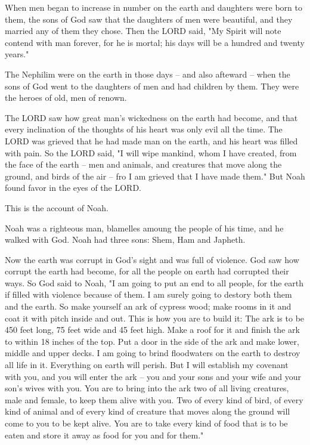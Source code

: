 \C When men began to increase in number on the earth and daughters were born to
them, \V the sons of God saw that the daughters of men were beautiful, and they
married any of them they chose. \V Then the LORD said, "My Spirit will note
contend with man forever, for he is mortal; his days will be a hundred and
twenty years."

\V The Nephilim were on the earth in those days -- and also afteward -- when the
sons of God went to the daughters of men and had children by them. They were the
heroes of old, men of renown.

\V The LORD saw how great man's wickedness on the earth had become, and that
every inclination of the thoughts of his heart was only evil all the time. \V
The LORD was grieved that he had made man on the earth, and his heart was filled
with pain. \V So the LORD said, "I will wipe mankind, whom I have created, from
the face of the earth -- men and animals, and creatures that move along the
ground, and birds of the air -- fro I am grieved that I have made them." \V But
Noah found favor in the eyes of the LORD.

\V This is the account of Noah.

Noah was a righteous man, blamelles amoung the people of his time, and he walked
with God. \V Noah had three sons: Shem, Ham and Japheth.

\V Now the earth was corrupt in God's sight and was full of violence. \V God saw
how corrupt the earth had become, for all the people on earth had corrupted
their ways. \V So God said to Noah, "I am going to put an end to all people, for
the earth if filled with violence because of them. I am surely going to destory
both them and the earth. \V So make yourself an ark of cypress wood; make rooms
in it and coat it with pitch inside and out. \V This is how you are to build it:
The ark is to be 450 feet long, 75 feet wide and 45 feet high. \V Make a roof
for it and finish the ark to within 18 inches of the top. Put a door in the side
of the ark and make lower, middle and upper decks. \V I am going to brind
floodwaters on the earth to destroy all life in it. Everything on earth will
perish. \V But I will establish my covenant with you, and you will enter the ark
-- you and your sons and your wife and your son's wives with you. \V You are to
bring into the ark two of all living creatures, male and female, to keep them
alive with you. \V Two of every kind of bird, of every kind of animal and of
every kind of creature that moves along the ground will come to you to be kept
alive. \V You are to take every kind of food that is to be eaten and store it
away as food for you and for them."


